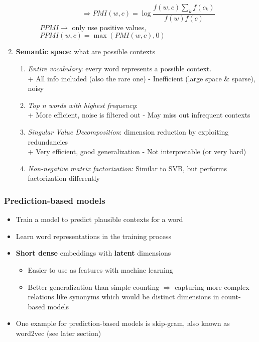 \begin{enumerate}
\begin{enumerate}
\begin{itemize}
			$$\Rightarrow PMI(w,c) = \log \frac{f(w,c)\sum_k f(c_k)}{f(w)f(c)}$$
			$PPMI\to$ only use positive values, $PPMI(w,c) =\max\left(PMI(w,c),0\right)$
		\end{itemize}
	\end{enumerate}
	\item \textbf{Semantic space}: what are possible contexts
	\begin{enumerate}
		\item \textit{Entire vocabulary}: every word represents a possible context.\\
		+ All info included (also the rare one) - Inefficient (large space \& sparse), noisy
		\item \textit{Top n words with highest frequency}: \\
		+ More efficient, noise is filtered out - May miss out infrequent contexts
		\item \textit{Singular Value Decomposition}: dimension reduction by exploiting redundancies\\
		+ Very efficient, good generalization - Not interpretable (or very hard)
		\item \textit{Non-negative matrix factorization}: Similar to SVB, but performs factorization differently
	\end{enumerate}
\end{enumerate}
\subsubsection{Prediction-based models}
\begin{itemize}
	\item Train a model to predict plausible contexts for a word
	\item Learn word representations in the training process
	\item \textbf{Short dense} embeddings with \textbf{latent} dimensions 
	\begin{itemize}
		\item Easier to use as features with machine learning
		\item Better generalization than simple counting $\Rightarrow$ capturing more complex relations like synonyms which would be distinct dimensions in count-based models
	\end{itemize}
	\item One example for prediction-based models is skip-gram, also known as word2vec (see later section)
\end{itemize}
